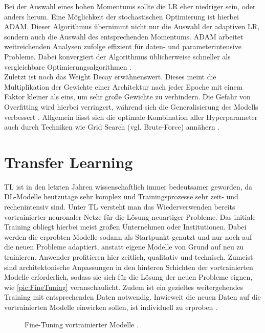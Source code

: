 \noindent
Bei der Auswahl eines hohen Momentums sollte die \ac{LR} eher niedriger sein, oder anders herum. Eine Möglichkeit der stochastischen Optimierung ist hierbei \ac{ADAM}. Dieser Algorithmus übernimmt nicht nur die Auswahl der adaptiven \ac{LR}, sondern auch die Auswahl des entsprechenden Momentums. \ac{ADAM} arbeitet weitreichenden Analysen zufolge effizient für daten- und parameterintensive Probleme. Dabei konvergiert der Algorithmus üblicherweise schneller als vergleichbare Optimierungsalgorithmen \cite[S.~1-2]{KIN17}.\\

\noindent
Zuletzt ist noch das Weight Decay erwähnenswert. Dieses meint die Multiplikation der Gewichte einer Architektur nach jeder Epoche mit einem Faktor kleiner als eins, um sehr große Gewichte zu verhindern. Die Gefahr von Overfitting wird hierbei verringert, während sich die Generalisierung des Modells verbessert \cite[S.~154]{ZHA20}. Allgemein lässt sich die optimale Kombination aller Hyperparameter auch durch Techniken wie Grid Search (vgl. Brute-Force) annähern \cite[S.~24]{YAN20}.


\section{Transfer Learning}
\noindent
\ac{TL} ist in den letzten Jahren wissenschaftlich immer bedeutsamer geworden, da \ac{DL}-Modelle heutzutage sehr komplex und Trainingsprozesse sehr zeit- und rechenintensiv sind. Unter \ac{TL} versteht man das Wiederverwenden bereits vortrainierter neuronaler Netze für die Lösung neuartiger Probleme. Das initiale Training obliegt hierbei meist großen Unternehmen oder Institutionen. Dabei werden die erprobten Modelle sodann als Startpunkt genutzt und nur noch auf die neuen Probleme adaptiert, anstatt eigene Modelle von Grund auf neu zu trainieren. Anwender profitieren hier zeitlich, qualitativ und technisch. Zumeist sind architektonische Anpassungen in den hinteren Schichten der vortrainierten Modelle erforderlich, sodass sie sich für die Lösung der neuen Probleme eignen, wie \autoref{pic:FineTuning} veranschaulicht. Zudem ist ein gezieltes weitergehendes Training mit entsprechenden Daten notwendig. Inwieweit die neuen Daten auf die vortrainierten Modelle einwirken sollen, ist individuell zu erproben \cite[S.~554]{ZHA20}.\\

\begin{figure}[h]
  \centering
  \caption{Fine-Tuning vortrainierter Modelle \cite[S.~555]{ZHA20}.}
  \label{pic:FineTuning}
\end{figure}

